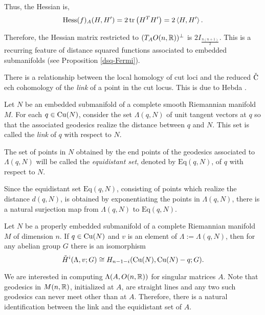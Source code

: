 \noindent Thus, the Hessian is, 
\begin{equation*}
\mathrm{Hess}(f)_A(H,H') =2\,\mathrm{tr}\left( H^TH' \right)=2\left\langle H, H'\right\rangle.
\end{equation*}

\noindent Therefore, the Hessian matrix  restricted to $(T_A O(n,\mathbb{R}))^\perp$ is $2I_{\frac{n(n+1)}{2}}$. This is a recurring feature of distance squared functions associated to embedded submanifolds (see Proposition \ref{dsq-Fermi}).

\vspace{0.3cm}
\hf There is a relationship between the local homology of cut loci and the reduced $\check{\textup{C}}$ech cohomology of the \textit{link} of a point in the cut locus. This is due to Hebda \cite[Theorem 1.4 and the remark following it]{Heb83}.
\begin{defn}
    Let $N$ be an embedded submanifold of a complete smooth Riemannian manifold $M$. For each $q\in \mathrm{Cu}(N)$, consider the set $\Lambda(q,N)$ of unit tangent vectors at $q$ so that the associated geodesics realize the distance between $q$ and $N$. This set is called the \textit{link} of $q$  with respect to $N$.

    \hf The set of points in $N$ obtained by the end points of the geodesics associated to $\Lambda(q,N)$ will be called the \textit{equidistant set}, denoted by $\mathrm{Eq}(q,N)$, of $q$ with respect to $N$. 
\end{defn}
\vspace{0.3cm}
\noindent Since the equidistant set  $\mathrm{Eq}(q,N)$, consisting of points which realize the distance $d(q,N)$, is obtained by exponentiating the points in $\Lambda(q,N)$, there is a natural surjection map from $\Lambda(q,N)$ to $\mathrm{Eq}(q,N)$. 
\begin{thm}[Hebda 1983]
    Let $N$ be a properly embedded submanifold of a complete Riemannian manifold $M$ of dimension $n$. If $q\in \mathrm{Cu}(N)$ and $v$ is an element of $\Lambda:=\Lambda(q,N)$, then for any abelian group $G$ there is an isomorphism
    \begin{equation}\label{duality}
        \check{H}^i(\Lambda,v;G)\cong H_{n-1-i}(\mathrm{Cu}(N),\mathrm{Cu}(N) -q;G).
    \end{equation}
\end{thm}
\vspace{0.3cm}
We are interested in computing $\Lambda(A,O(n,\mathbb{R}))$ for singular matrices $A$. Note that geodesics in $M(n,\mathbb{R})$, initialized at $A$, are straight lines and any two such geodesics can never meet other than at $A$. Therefore, there is a natural identification between the link and the equidistant set of $A$. 
